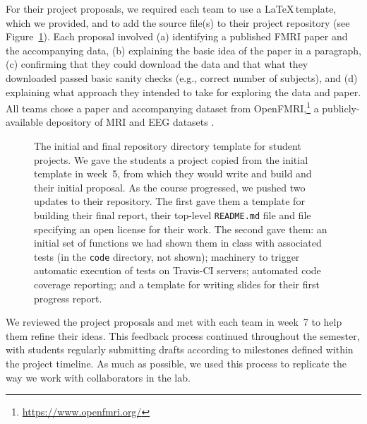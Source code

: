 For their project proposals, we required each team to use a \LaTeX\,template,
which we provided, and to add the source file(s) to their project repository
(see Figure~\ref{fig:repo}).
Each proposal involved
(a) identifying a published FMRI paper and the accompanying data,
(b) explaining the basic idea of the paper in a paragraph,
(c) confirming that they could download the data and that what they
downloaded passed basic sanity checks (e.g., correct number of subjects), and
(d) explaining what approach they intended to take for exploring
the data and paper.
All teams chose a paper and accompanying dataset from
OpenFMRI,\footnote{\url{https://www.openfmri.org/}} a publicly-available
depository of MRI and EEG datasets
\citep{poldrack2013toward,poldrack2015openfmri}.


\begin{figure}
\centering

\caption{The initial and final repository directory template for student
    projects.  We gave the students a project copied from the initial template
    in week~5, from which they would write and build and their initial
    proposal.  As the course progressed, we pushed two updates to their
    repository. The first gave them a template for building their final
    report, their top-level \texttt{README.md} file and file specifying an
    open license for their work. The second gave them: an initial set of
    functions we had shown them in class with associated tests (in the
    \texttt{code} directory, not shown); machinery to trigger automatic
    execution of tests on Travis-CI servers; automated code coverage
    reporting; and a template for writing slides for their first progress
    report.}
\label{fig:repo}
\end{figure}

We reviewed the project proposals and met with each team in week~7 to help
them refine their ideas.
This feedback process continued throughout the semester, with students
regularly submitting drafts according to milestones defined within the project
timeline.
As much as possible, we used this process to replicate the way we
work with collaborators in the lab.


